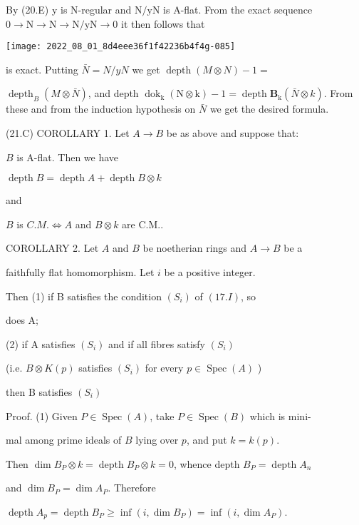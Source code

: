 By (20.E) y is N-regular and $\mathrm{N} / \mathrm{yN}$ is A-flat. From the exact sequence $0 \rightarrow \mathrm{N} \rightarrow \mathrm{N} \rightarrow \mathrm{N} / \mathrm{yN} \rightarrow 0$ it then follows that

\texttt{[image: 2022\_08\_01\_8d4eee36f1f42236b4f4g-085]}

is exact. Putting $\bar{N}=N / y N$ we get $\operatorname{depth}(M \otimes N)-1=$

$\operatorname{depth}_{B}(M \otimes \bar{N})$, and depth $\operatorname{dok}_{\mathrm{k}}(\mathrm{N} \otimes \mathrm{k})-1=\operatorname{depth} \boldsymbol{B}_{\mathrm{k}}(\bar{N} \otimes k)$. From these and from the induction hypothesis on $\bar{N}$ we get the desired formula.

(21.C) COROLLARY 1. Let $A \rightarrow B$ be as above and suppose that:

$B$ is A-flat. Then we have

$\operatorname{depth} B=\operatorname{depth} A+\operatorname{depth} B \otimes k$

and

$B$ is $C . M . \Longleftrightarrow A$ and $B \otimes k$ are C.M..

COROLLARY 2. Let $A$ and $B$ be noetherian rings and $A \rightarrow B$ be a

faithfully flat homomorphism. Let $i$ be a positive integer.

Then (1) if B satisfies the condition $\left(S_{i}\right)$ of $(17 . I)$, so

does A;

(2) if A satisfies $\left(S_{i}\right)$ and if all fibres satisfy $\left(S_{i}\right)$

(i.e. $B \otimes K(p)$ satisfies $\left(S_{i}\right)$ for every $p \in \operatorname{Spec}(A)$ )

then B satisfies $\left(S_{i}\right)$

Proof. (1) Given $P \in \operatorname{Spec}(A)$, take $P \in \operatorname{Spec}(B)$ which is mini-

mal among prime ideals of $B$ lying over $p$, and put $k=k(p)$.

Then $\operatorname{dim} B_{P} \otimes k=\operatorname{depth} B_{P} \otimes k=0$, whence depth $B_{P}=\operatorname{depth} A_{n}$

and $\operatorname{dim} B_{P}=\operatorname{dim} A_{P}$. Therefore

$\operatorname{depth} A_{p}=\operatorname{depth} B_{P} \geqslant \inf \left(i, \operatorname{dim} B_{P}\right)=\inf \left(i, \operatorname{dim} A_{P}\right)$.

